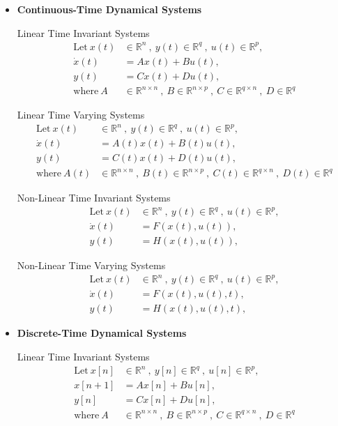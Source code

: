 \documentclass[twoside]{article}
\begin{document}
\begin{itemize}

\item \textbf{Continuous-Time Dynamical Systems}

Linear Time Invariant Systems
%
\begin{align*}
  \mathrm{Let} \ x(t) &\in \mathbb{R}^n \ , \ y(t) \in \mathbb{R}^q \ ,\  u(t) \in
  \mathbb{R}^p , \\
  \dot{x}(t) &= A x(t) + B u(t) , \\
  y(t) &= C x(t) + D u(t) , \\
  \mathrm{where} \ A &\in \mathbb{R}^{n \times n} \ , \ 
    B \in \mathbb{R}^{n \times p} \ ,\  C \in \mathbb{R}^{q \times n} \ , \ D \in \mathbb{R}^q
\end{align*}

Linear Time Varying Systems
%
\begin{align*}
  \mathrm{Let} \ x(t) &\in \mathbb{R}^n \ , \ y(t) \in \mathbb{R}^q \ ,\  u(t) \in
  \mathbb{R}^p , \\
  \dot{x}(t) &= A(t) x(t) + B(t) u(t) , \\
  y(t) &= C(t) x(t) + D(t) u(t) , \\
  \mathrm{where} \ A(t) &\in \mathbb{R}^{n \times n} \ , \ 
    B(t) \in \mathbb{R}^{n \times p} \ ,\  C(t) \in \mathbb{R}^{q \times n} \ , \ D(t) \in \mathbb{R}^q
\end{align*}

Non-Linear Time Invariant Systems
%
\begin{align*}
  \mathrm{Let} \ x(t) &\in \mathbb{R}^n \ , \ y(t) \in \mathbb{R}^q \ ,\  u(t) \in
  \mathbb{R}^p , \\
  \dot{x}(t) &= F(x(t),u(t)) , \\
  y(t) &= H(x(t),u(t)) , 
\end{align*}

Non-Linear Time Varying Systems
%
\begin{align*}
  \mathrm{Let} \ x(t) &\in \mathbb{R}^n \ , \ y(t) \in \mathbb{R}^q \ ,\  u(t) \in
  \mathbb{R}^p , \\
  \dot{x}(t) &= F(x(t),u(t),t) , \\
  y(t) &= H(x(t),u(t),t) , 
\end{align*}

\item \textbf{Discrete-Time Dynamical Systems}

Linear Time Invariant Systems
%
\begin{align*}
  \mathrm{Let} \ x[n] &\in \mathbb{R}^n \ , \ y[n] \in \mathbb{R}^q \ ,\  u[n] \in
  \mathbb{R}^p , \\
  x[n+1] &= A x[n] + B u[n] , \\
  y[n] &= C x[n] + D u[n] , \\
  \mathrm{where} \ A &\in \mathbb{R}^{n \times  n} \ , \ 
    B \in \mathbb{R}^{n \times p} \ ,\  C \in \mathbb{R}^{q \times n} \ , \ D \in \mathbb{R}^q
\end{align*}


\end{itemize}
\end{document}
